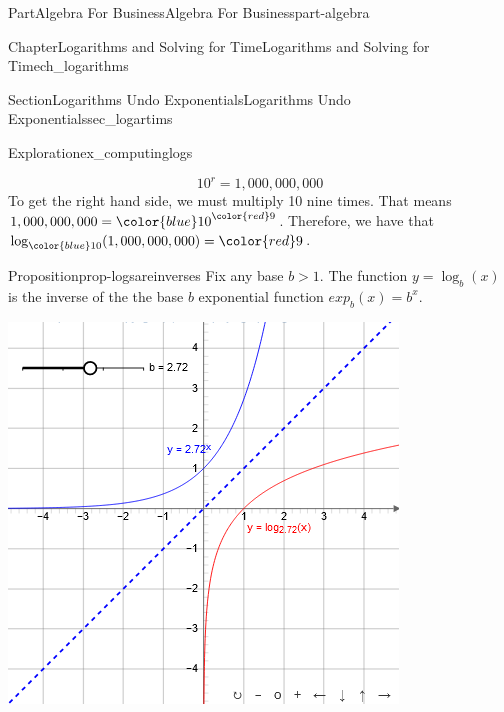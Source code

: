 \documentclass{tufte-book}
\numberwithin{equation}{chapter}
\begin{document}
\begin{partptx}{Part}{Algebra For Business}{}{Algebra For Business}{}{}{part-algebra}
\begin{chapterptx}{Chapter}{Logarithms and Solving for Time}{}{Logarithms and Solving for Time}{}{}{ch_logarithms}
\begin{sectionptx}{Section}{Logarithms Undo Exponentials}{}{Logarithms Undo Exponentials}{}{}{sec_logartims}
\begin{exploration}{Exploration}{}{ex_computinglogs}
\begin{enumerate}[font=\bfseries,label=(\alph*),ref=\alph*]
\begin{equation*}
10^r = 1,000,000,000
\end{equation*}
To get the right hand side, we must multiply 10 nine times.  That means \(1,000,000,000 = {\color{blue}10}^{\color{red}9}\).  Therefore, we have that \(\log_{\color{blue} 10} (1,000,000,000) = {\color{red}9}\).%
\end{enumerate}%
\end{exploration}%
\begin{proposition}{Proposition}{}{}{prop-logsareinverses}%
Fix any base \(b>1\). The function \(y = \log_b(x)\) is the inverse of the the base \(b\) exponential function \(exp_b(x) = b^x\).%
\end{proposition}
\begin{sidebyside}{2}{0.075}{0.075}{0.17}%
\begin{sbspanel}{0.47}%
\includegraphics[width=\linewidth]{external/jsxgraph-algebra-loggraph.png}
\end{sbspanel}%
\begin{sbspanel}{0.21}%

\end{sbspanel}
\end{sidebyside}
\end{sectionptx}
\end{chapterptx}
\end{partptx}
\end{document}
